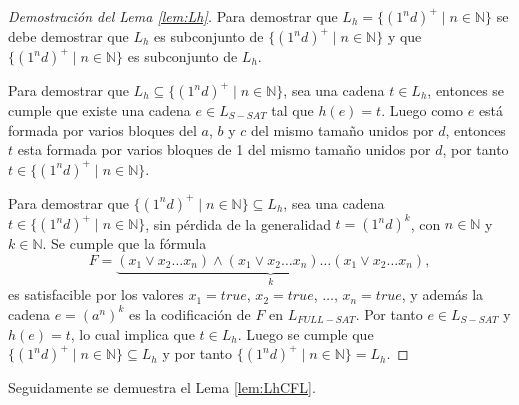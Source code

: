 \documentclass[12pt]{article}
\begin{document}
\begin{proof}[Demostración del Lema \ref{lem:Lh}]
    Para demostrar que $L_h=\{(1^nd)^+\mid n\in \mathbb{N}\}$ se debe demostrar que $L_h$ es subconjunto de $\{(1^nd)^+\mid n\in \mathbb{N}\}$ y 
    que $\{(1^nd)^+\mid n\in \mathbb{N}\}$ es subconjunto de $L_h$.
    
    Para demostrar que $L_h\subseteq \{(1^nd)^+\mid n\in \mathbb{N}\}$, sea una cadena $t\in L_h$, entonces se cumple que existe una cadena
    $e\in L_{S-SAT}$ tal que $h(e)=t$. Luego como $e$ está formada por varios bloques del $a$, $b$ y $c$ del mismo tamaño
    unidos por $d$, entonces $t$ esta formada por varios bloques de 1 del mismo tamaño unidos por $d$, por tanto $t\in \{(1^nd)^+\mid n\in \mathbb{N}\}$.
    
    Para demostrar que $\{(1^nd)^+\mid n\in \mathbb{N}\}\subseteq L_h$, sea una cadena $t\in \{(1^nd)^+\mid n\in \mathbb{N}\}$, sin pérdida
    de la generalidad $t=(1^nd)^k$, con $n\in \mathbb{N}$ y $k\in \mathbb{N}$. Se cumple que la fórmula 
    $$F=\underbrace{(x_1\vee x_2 \ldots x_n) \wedge (x_1\vee x_2 \ldots x_n) \ldots (x_1\vee x_2 \ldots x_n)}_{k},$$
    es satisfacible por los valores $x_1=true$, $x_2=true$, $\ldots$, $x_n=true$, y además la cadena $e=(a^n)^k$ es la codificación
    de $F$ en $L_{FULL-SAT}$. Por tanto  $e\in L_{S-SAT}$ y $h(e)=t$, lo cual implica que $t\in L_h$. Luego se cumple
    que $\{(1^nd)^+\mid n\in \mathbb{N}\}\subseteq L_h$ y por tanto $\{(1^nd)^+\mid n\in \mathbb{N}\}= L_h$.
\end{proof}

Seguidamente se demuestra el Lema \ref{lem:LhCFL}.
\end{document}

